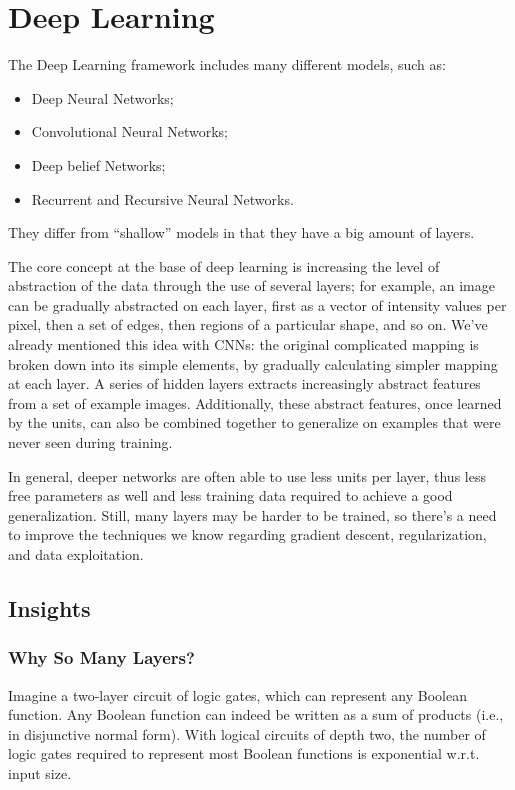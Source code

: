 \section{Deep Learning}

The Deep Learning framework includes many different models, such as:
\begin{itemize}
    \item Deep Neural Networks;
    \item Convolutional Neural Networks;
    \item Deep belief Networks;
    \item Recurrent and Recursive Neural Networks.
\end{itemize}
They differ from ``shallow'' models in that they have a big amount of layers.

The core concept at the base of deep learning is increasing the level of abstraction of the data through the use of several layers; for example, an image can be gradually abstracted on each layer, first as a vector of intensity values per pixel, then a set of edges, then regions of a particular shape, and so on. We've already mentioned this idea with CNNs: the original complicated mapping is broken down into its simple elements, by gradually calculating simpler mapping at each layer. A series of hidden layers extracts increasingly abstract features from a set of example images. Additionally, these abstract features, once learned by the units, can also be combined together to generalize on examples that were never seen during training.

In general, deeper networks are often able to use less units per layer, thus less free parameters as well and less training data required to achieve a good generalization. Still, many layers may be harder to be trained, so there's a need to improve the techniques we know regarding gradient descent, regularization, and data exploitation.

\subsection{Insights}

\subsubsection{Why So Many Layers?}

Imagine a two-layer circuit of logic gates, which can represent any Boolean function. Any Boolean function can indeed be written as a sum of products (i.e., in disjunctive normal form). With logical circuits of depth two, the number of logic gates required to represent most Boolean functions is exponential w.r.t. input size.

